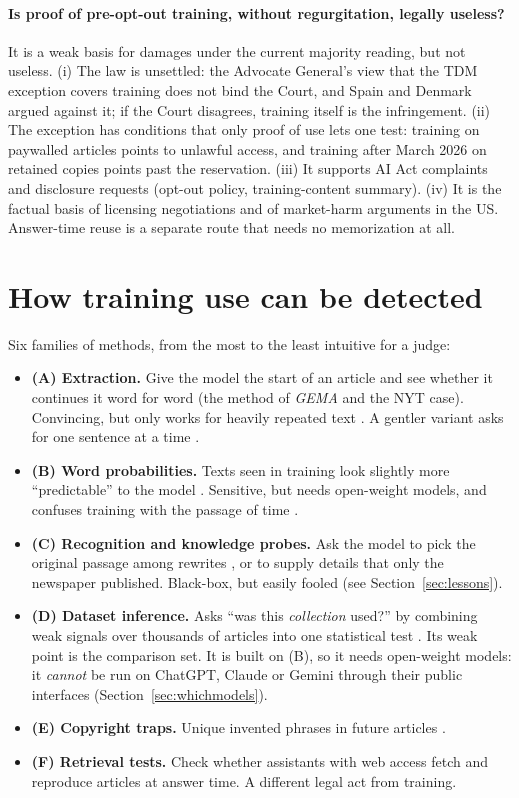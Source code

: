 \documentclass[10pt,a4paper]{article}
\begin{document}
\paragraph{Is proof of pre-opt-out training, without regurgitation, legally useless?} It is a weak basis for damages
under the current majority reading, but not useless. (i) The law is unsettled: the Advocate General's view that the TDM
exception covers training does not bind the Court, and Spain and Denmark argued against it; if the Court disagrees,
training itself is the infringement. (ii) The exception has conditions that only proof of use lets one test: training
on paywalled articles points to unlawful access, and training after March 2026 on retained copies points past the
reservation. (iii) It supports AI Act complaints and disclosure requests (opt-out policy, training-content summary).
(iv) It is the factual basis of licensing negotiations and of market-harm arguments in the US. Answer-time reuse is a
separate route that needs no memorization at all.

\section{How training use can be detected}\label{sec:methods}
Six families of methods, from the most to the least intuitive for a judge:
\begin{itemize}
\item \textbf{(A) Extraction.} Give the model the start of an article and see whether it continues it word for word
(the method of \emph{GEMA} and the NYT case). Convincing, but only works for heavily repeated text
\cite{carlini2023,freeman2024}. A gentler variant asks for one sentence at a time \cite{su2024}.
\item \textbf{(B) Word probabilities.} Texts seen in training look slightly more ``predictable'' to the model
\cite{shi2024,zhang2024}. Sensitive, but needs open-weight models, and confuses training with the passage of time
\cite{duan2024,das2024}.
\item \textbf{(C) Recognition and knowledge probes.} Ask the model to pick the original passage among rewrites
\cite{duarte2024}, or to supply details that only the newspaper published. Black-box, but easily fooled (see
Section~\ref{sec:lessons}).
\item \textbf{(D) Dataset inference.} Asks ``was this \emph{collection} used?'' by combining weak signals over
thousands of articles into one statistical test \cite{maini2024}. Its weak point is the comparison set. It is
built on (B), so it needs open-weight models: it \emph{cannot} be run on ChatGPT, Claude or Gemini through their
public interfaces (Section~\ref{sec:whichmodels}).
\item \textbf{(E) Copyright traps.} Unique invented phrases in future articles \cite{meeus2024}.
\item \textbf{(F) Retrieval tests.} Check whether assistants with web access fetch and reproduce articles at answer
time. A different legal act from training.
\end{itemize}
\end{document}
